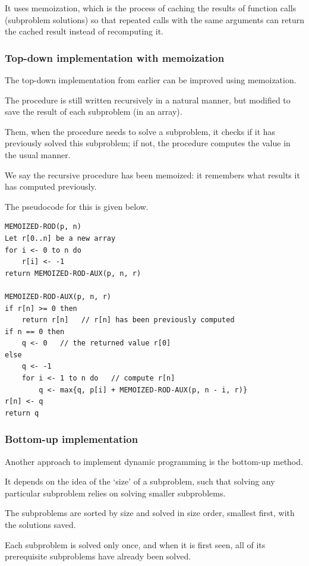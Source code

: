 \documentclass[11pt]{article}
\begin{document}
It uses memoization, which is the process of caching the results of
function calls (subproblem solutions) so that repeated calls with the
same arguments can return the cached result instead of recomputing it.

    \subsubsection{Top-down implementation with
memoization}\label{top-down-implementation-with-memoization}

The top-down implementation from earlier can be improved using
memoization.

The procedure is still written recursively in a natural manner, but
modified to save the result of each subproblem (in an array).

Them, when the procedure needs to solve a subproblem, it checks if it
has previously solved this subproblem; if not, the procedure computes
the value in the usual manner.

We say the recursive procedure has been memoized: it remembers what
results it has computed previously.

The pseudocode for this is given below.

\begin{verbatim}
MEMOIZED-ROD(p, n)
Let r[0..n] be a new array
for i <- 0 to n do
    r[i] <- -1
return MEMOIZED-ROD-AUX(p, n, r)

MEMOIZED-ROD-AUX(p, n, r)
if r[n] >= 0 then
    return r[n]   // r[n] has been previously computed
if n == 0 then
    q <- 0   // the returned value r[0]
else
    q <- -1
    for i <- 1 to n do   // compute r[n]
        q <- max{q, p[i] + MEMOIZED-ROD-AUX(p, n - i, r)}
r[n] <- q
return q
\end{verbatim}

    \subsubsection{Bottom-up implementation}\label{bottom-up-implementation}

Another approach to implement dynamic programming is the bottom-up
method.

It depends on the idea of the `size' of a subproblem, such that solving
any particular subproblem relies on solving smaller subproblems.

The subproblems are sorted by size and solved in size order, smallest
first, with the solutions saved.

Each subproblem is solved only once, and when it is first seen, all of
its prerequisite subproblems have already been solved.
\end{document}
